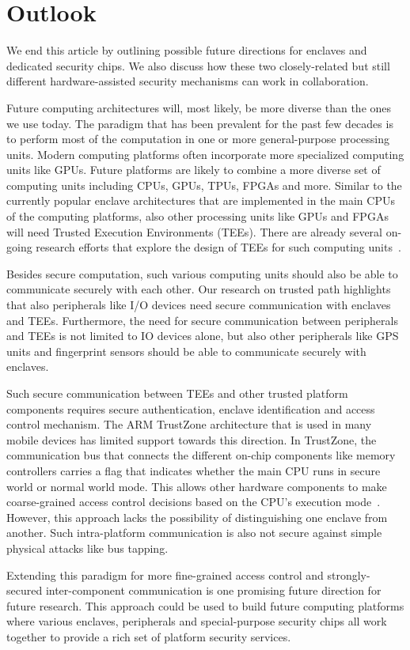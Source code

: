 
\section*{Outlook}

We end this article by outlining possible future directions for enclaves and dedicated security chips. We also discuss how these two closely-related but still different hardware-assisted security mechanisms can work in collaboration.

Future computing architectures will, most likely, be more diverse than the ones we use today. The paradigm that has been prevalent for the past few decades is to perform most of the computation in one or more general-purpose processing units. Modern computing platforms often incorporate more specialized computing units like GPUs. Future platforms are likely to combine a more diverse set of computing units including CPUs, GPUs, TPUs, FPGAs and more. %
Similar to the currently popular enclave architectures that are implemented in the main CPUs of the computing platforms, also other processing units like GPUs and FPGAs will need Trusted Execution Environments (TEEs). There are already several on-going research efforts that explore the design of TEEs for such computing units~\cite{volos2018graviton}.

Besides secure computation, such various computing units should also be able to communicate securely with each other. Our research on trusted path highlights that also peripherals like I/O devices need secure communication with enclaves and TEEs. Furthermore, the need for secure communication between peripherals and TEEs is not limited to IO devices alone, but also other peripherals like GPS units and fingerprint sensors should be able to communicate securely with enclaves. 

Such secure communication between TEEs and other trusted platform components requires secure authentication, enclave identification and access control mechanism. The ARM TrustZone architecture that is used in many mobile devices has limited support towards this direction. In TrustZone, the communication bus that connects the different on-chip components like memory controllers carries a flag that indicates whether the main CPU runs in secure world or normal world mode. This allows other hardware components to make coarse-grained access control decisions based on the CPU's execution mode~\cite{ekberg2014untapped}. However, this approach lacks the possibility of distinguishing one enclave from another. Such intra-platform communication is also not secure against simple physical attacks like bus tapping. 

Extending this paradigm for more fine-grained access control and strongly-secured inter-component communication is one promising future direction for future research. This approach could be used to build future computing platforms where various enclaves, peripherals and special-purpose security chips all work together to provide a rich set of platform security services.
